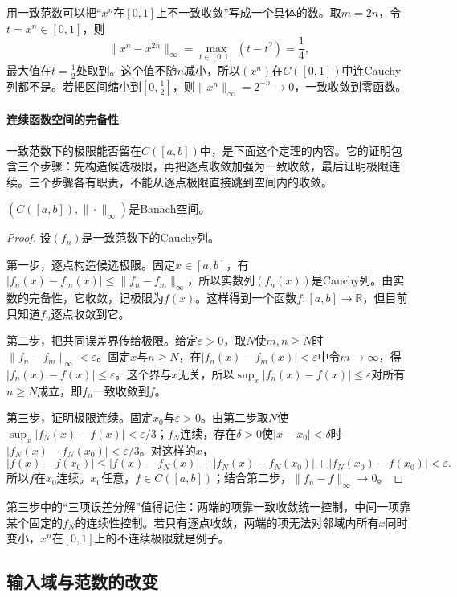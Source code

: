 用一致范数可以把“$x^n$在$[0,1]$上不一致收敛”写成一个具体的数。取$m=2n$，令$t=x^n\in[0,1]$，则
\[
 \|x^n-x^{2n}\|_\infty=\max_{t\in[0,1]}(t-t^2)=\frac14,
\]
最大值在$t=\tfrac12$处取到。这个值不随$n$减小，所以$(x^n)$在$C([0,1])$中连Cauchy列都不是。若把区间缩小到$[0,\tfrac12]$，则$\|x^n\|_\infty=2^{-n}\to0$，一致收敛到零函数。

\paragraph{连续函数空间的完备性}
一致范数下的极限能否留在$C([a,b])$中，是下面这个定理的内容。它的证明包含三个步骤：先构造候选极限，再把逐点收敛加强为一致收敛，最后证明极限连续。三个步骤各有职责，不能从逐点极限直接跳到空间内的收敛。

\begin{theorem}[连续函数空间的完备性]
\label{thm:fs-continuous-complete}
$(C([a,b]),\|\cdot\|_\infty)$是Banach空间。
\end{theorem}

\begin{proof}
设$(f_n)$是一致范数下的Cauchy列。

第一步，逐点构造候选极限。固定$x\in[a,b]$，有$|f_n(x)-f_m(x)|\leq\|f_n-f_m\|_\infty$，所以实数列$(f_n(x))$是Cauchy列。由实数的完备性，它收敛，记极限为$f(x)$。这样得到一个函数$f:[a,b]\to\mathbb R$，但目前只知道$f_n$逐点收敛到它。

第二步，把共同误差界传给极限。给定$\varepsilon>0$，取$N$使$m,n\geq N$时$\|f_n-f_m\|_\infty<\varepsilon$。固定$x$与$n\geq N$，在$|f_n(x)-f_m(x)|<\varepsilon$中令$m\to\infty$，得$|f_n(x)-f(x)|\leq\varepsilon$。这个界与$x$无关，所以$\sup_x|f_n(x)-f(x)|\leq\varepsilon$对所有$n\geq N$成立，即$f_n$一致收敛到$f$。

第三步，证明极限连续。固定$x_0$与$\varepsilon>0$。由第二步取$N$使$\sup_x|f_N(x)-f(x)|<\varepsilon/3$；$f_N$连续，存在$\delta>0$使$|x-x_0|<\delta$时$|f_N(x)-f_N(x_0)|<\varepsilon/3$。对这样的$x$，
\[
 |f(x)-f(x_0)|\leq|f(x)-f_N(x)|+|f_N(x)-f_N(x_0)|+|f_N(x_0)-f(x_0)|<\varepsilon .
\]
所以$f$在$x_0$连续。$x_0$任意，$f\in C([a,b])$；结合第二步，$\|f_n-f\|_\infty\to0$。
\end{proof}

第三步中的“三项误差分解”值得记住：两端的项靠一致收敛统一控制，中间一项靠某个固定的$f_N$的连续性控制。若只有逐点收敛，两端的项无法对邻域内所有$x$同时变小，$x^n$在$[0,1]$上的不连续极限就是例子。

\subsection{输入域与范数的改变}
\label{sec:fs-domain-norm-change}

